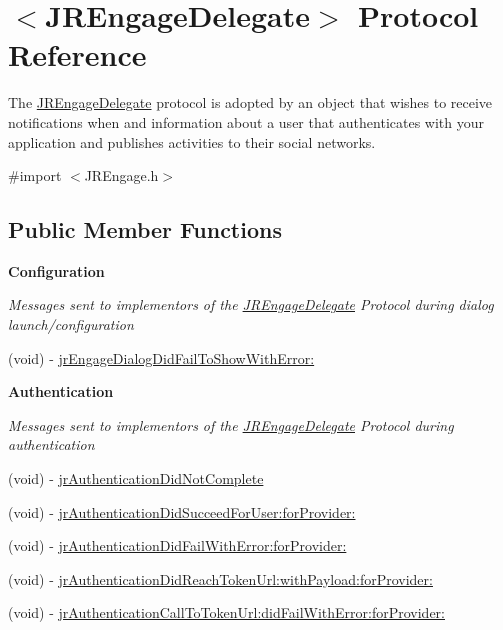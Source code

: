 \hypertarget{protocol_j_r_engage_delegate-p}{
\section{$<$JREngageDelegate$>$ Protocol Reference}
\label{protocol_j_r_engage_delegate-p}
}


The \hyperlink{protocol_j_r_engage_delegate-p}{JREngageDelegate} protocol is adopted by an object that wishes to receive notifications when and information about a user that authenticates with your application and publishes activities to their social networks.  




{\ttfamily \#import $<$JREngage.h$>$}

\subsection*{Public Member Functions}
\begin{Indent}{\bf Configuration}\par
{\em \label{_amgrp254f642527b45bc260048e30704edb39}
 Messages sent to implementors of the \hyperlink{protocol_j_r_engage_delegate-p}{JREngageDelegate} Protocol during dialog launch/configuration }\begin{DoxyCompactItemize}
\item 
(void) -\/ \hyperlink{protocol_j_r_engage_delegate-p_af46f7ef0c7a5767dc0ab705871d570ac}{jrEngageDialogDidFailToShowWithError:}
\end{DoxyCompactItemize}
\end{Indent}
\begin{Indent}{\bf Authentication}\par
{\em \label{_amgrpc75f7811d70d17dbcd88e9d03752cbed}
 Messages sent to implementors of the \hyperlink{protocol_j_r_engage_delegate-p}{JREngageDelegate} Protocol during authentication }\begin{DoxyCompactItemize}
\item 
(void) -\/ \hyperlink{protocol_j_r_engage_delegate-p_a4eaa6a5961e175b8275c6b06034afea7}{jrAuthenticationDidNotComplete}
\item 
(void) -\/ \hyperlink{protocol_j_r_engage_delegate-p_a4f7d0494498c551c858cdeb640b86eae}{jrAuthenticationDidSucceedForUser:forProvider:}
\item 
(void) -\/ \hyperlink{protocol_j_r_engage_delegate-p_ac16b7db45fd324d597260dc8579b3a22}{jrAuthenticationDidFailWithError:forProvider:}
\item 
(void) -\/ \hyperlink{protocol_j_r_engage_delegate-p_abfafec7eed95008f7b7052d962f8f6fa}{jrAuthenticationDidReachTokenUrl:withPayload:forProvider:}
\item 
(void) -\/ \hyperlink{protocol_j_r_engage_delegate-p_a670eab0f76e79ba90a246a2f3e4dfe04}{jrAuthenticationCallToTokenUrl:didFailWithError:forProvider:}
\end{DoxyCompactItemize}
\end{Indent}
